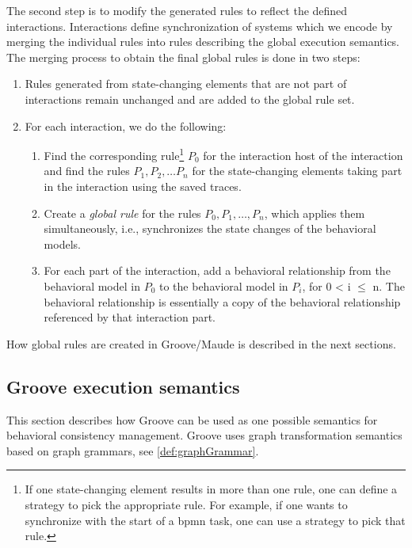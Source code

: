 \documentclass{jot}
\begin{document}
The second step is to modify the generated rules to reflect the defined interactions.
Interactions define synchronization of systems which we encode by merging the individual rules into rules describing the global execution semantics.
The merging process to obtain the final global rules is done in two steps:

\begin{enumerate}
    \item Rules generated from state-changing elements that are not part of interactions remain unchanged and are added to the global rule set.
    \item For each interaction, we do the following:
     \begin{enumerate}
         \item Find the corresponding rule\footnote{If one state-changing element results in more than one rule, one can define a strategy to pick the appropriate rule.
         For example, if one wants to synchronize with the start of a \gls*{bpmn} task, one can use a strategy to pick that rule.} $P_0$ for the interaction host of the interaction and find the rules $P_1, P_2, \ldots P_n$ for the state-changing elements taking part in the interaction using the saved traces.
         \item Create a \textit{global rule} for the rules $P_0, P_1, \ldots, P_n$, which applies them simultaneously, i.e., synchronizes the state changes of the behavioral models.
         \item For each part of the interaction, add a behavioral relationship from the behavioral model in $P_0$ to the behavioral model in $P_i$, for 0 < i $\leq$ n.
         The behavioral relationship is essentially a copy of the behavioral relationship referenced by that interaction part.
     \end{enumerate}
\end{enumerate}

How global rules are created in Groove/Maude is described in the next sections.

\subsection{Groove execution semantics} 
This section describes how Groove can be used as one possible semantics for behavioral consistency management.
Groove uses graph transformation semantics based on graph grammars, see \autoref{def:graphGrammar}.
\end{document}

